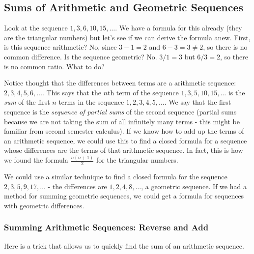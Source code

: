 \documentclass[12pt]{article}
\begin{document}
\subsection{Sums of Arithmetic and Geometric Sequences}

Look at the sequence $1, 3, 6, 10, 15,\ldots$.  We have a formula for this already (they are the triangular numbers) but let's see if we can derive the formula anew.  First, is this sequence arithmetic?  No, since $3-1 = 2$ and $6-3 = 3 \ne 2$, so there is no common difference.  Is the sequence geometric?  No.  $3/1 = 3$ but $6/3 = 2$, so there is no common ratio.  What to do?  

Notice thought that the differences between terms are a arithmetic sequence: $2, 3, 4, 5, 6,\ldots$.  This says that the $n$th term of the sequence $1,3,5,10,15,\ldots$ is the {\em sum} of the first $n$ terms in the sequence $1,2,3,4,5,\ldots$.  We say that the first sequence is the {\em sequence of partial sums} of the second sequence (partial sums because we are not taking the sum of all infinitely many terms - this might be familiar from second semester calculus). If we know how to add up the terms of an arithmetic sequence, we could use this to find a closed formula for a sequence whose differences are the terms of that arithmetic sequence.  In fact, this is how we found the formula $\frac{n(n+1)}{2}$ for the triangular numbers.

We could use a similar technique to find a closed formula for the sequence $2, 3, 5, 9, 17, \ldots$ - the differences are $1, 2, 4, 8, \ldots$, a geometric sequence.  If we had a method for summing geometric sequences, we could get a formula for sequences with geometric differences.

\subsubsection*{Summing Arithmetic Sequences: Reverse and Add}
Here is a trick that allows us to quickly find the sum of an arithmetic sequence. 
\end{document}
